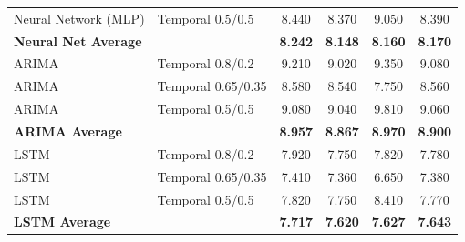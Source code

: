 \documentclass[11pt,a4paper]{article}
\begin{document}
\begin{table}[H]
\begin{tabular}{llcccc}
Neural Network (MLP) & Temporal 0.5/0.5 & 8.440 & 8.370 & 9.050 & 8.390 \\
\textbf{Neural Net Average} & & \textbf{8.242} & \textbf{8.148} & \textbf{8.160} & \textbf{8.170} \\
\midrule
ARIMA & Temporal 0.8/0.2 & 9.210 & 9.020 & 9.350 & 9.080 \\
ARIMA & Temporal 0.65/0.35 & 8.580 & 8.540 & 7.750 & 8.560 \\
ARIMA & Temporal 0.5/0.5 & 9.080 & 9.040 & 9.810 & 9.060 \\
\textbf{ARIMA Average} & & \textbf{8.957} & \textbf{8.867} & \textbf{8.970} & \textbf{8.900} \\
\midrule
LSTM & Temporal 0.8/0.2 & 7.920 & 7.750 & 7.820 & 7.780 \\
LSTM & Temporal 0.65/0.35 & 7.410 & 7.360 & 6.650 & 7.380 \\
LSTM & Temporal 0.5/0.5 & 7.820 & 7.750 & 8.410 & 7.770 \\
\textbf{LSTM Average} & & \textbf{7.717} & \textbf{7.620} & \textbf{7.627} & \textbf{7.643} \\
\bottomrule
\end{tabular}
\end{table}
\end{document}
